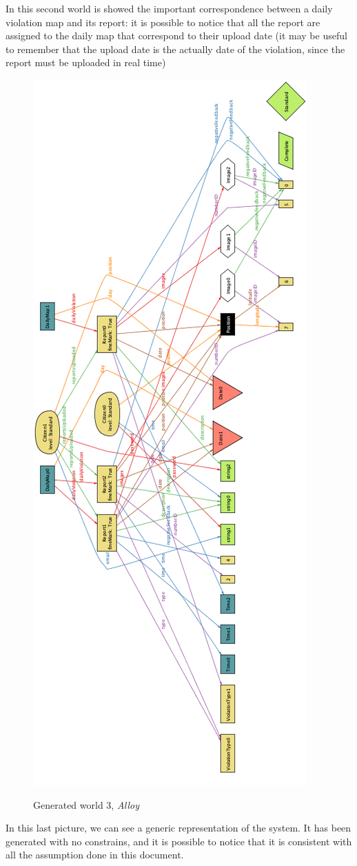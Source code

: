 \documentclass[../RASD.tex]{subfiles}
\begin{document}
    In this second world is showed the important correspondence between a daily violation map and its report:
    it is possible to notice that all the report are assigned to the daily map that correspond to their upload date (it may be useful to remember that the upload date is the actually date of the violation, since the report must be uploaded in real time)

    \begin{figure}[H]
        \centering
        \includegraphics[scale = 0.7]{assets/world3.png}\\
        \caption[Generated world 3, \textit{Alloy}]{Generated world 3, \textit{Alloy}}
    \end{figure}

    In this last picture, we can see a generic representation of the system.
    It has been generated with no constrains, and it is possible to notice that it is consistent with all the assumption done in this document.
\end{document}
